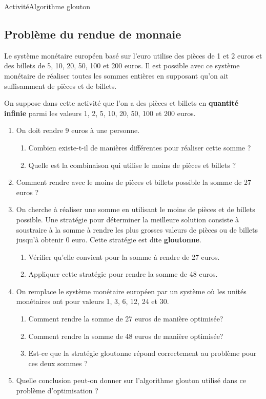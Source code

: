 \documentclass[11pt,a4paper]{article}
\begin{document}
\begin{NSI}
{Activité}{Algorithme glouton}
\end{NSI}


\subsection*{Problème du rendue de monnaie}

Le système monétaire européen basé sur l'euro utilise des pièces de 1 et 2 euros et des billets de 5, 10, 20, 50, 100 et 200 euros. Il est possible avec ce système monétaire de réaliser toutes les sommes entières en supposant qu'on ait suffisamment de pièces et de billets.

On suppose dans cette activité que l'on a des pièces et billets en \textbf{quantité infinie} parmi les valeurs 1, 2, 5, 10, 20, 50, 100 et 200 euros.

\begin{enumerate}
\item On doit rendre 9 euros à une personne.
\begin{enumerate}
\item Combien existe-t-il de manières différentes pour réaliser cette somme ?
\item Quelle est la combinaison qui utilise le moins de pièces et billets ?
\end{enumerate}
\item Comment rendre avec le moins de pièces et billets possible la somme de 27 euros ?


\item On cherche à réaliser une somme en utilisant le moins de pièces et de billets possible. Une stratégie pour déterminer la meilleure solution consiste à soustraire à la somme à rendre les plus grosses valeurs de pièces ou de billets jusqu'à obtenir 0 euro. Cette stratégie est dite \textbf{gloutonne}.

\begin{enumerate}
\item Vérifier qu'elle convient pour la somme à rendre de 27 euros.
\item Appliquer cette stratégie pour rendre la somme de 48 euros.
\end{enumerate}

\item On remplace le système monétaire européen par un système où les unités monétaires ont pour valeurs 1, 3, 6, 12, 24 et 30.
\begin{enumerate}
\item Comment rendre la somme de 27 euros de manière optimisée?
\item Comment rendre la somme de 48 euros de manière optimisée?
\item Est-ce que la stratégie gloutonne répond correctement au problème pour ces deux sommes ?
\end{enumerate}
\item Quelle conclusion peut-on donner sur l'algorithme glouton utilisé dans ce problème d'optimisation ?
\end{enumerate}
\end{document}
